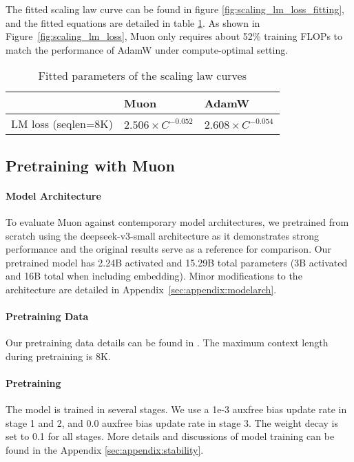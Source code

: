     
The fitted scaling law curve can be found in figure \ref{fig:scaling_lm_loss_fitting}, and the fitted equations are detailed in table \ref{tab:fit}. As shown in Figure~\ref{fig:scaling_lm_loss}, Muon only requires about 52\% training FLOPs to match the performance of AdamW under compute-optimal setting. 


\begin{table}
\centering
\caption{Fitted parameters of the scaling law curves}
\label{tab:fit}
\begin{tabular}{c|l|l}
\toprule
 & Muon & AdamW \\
\midrule
LM loss (seqlen=8K) & $2.506 \times C^{-0.052}$ & $2.608 \times C^{-0.054}$ \\
\bottomrule
\end{tabular}
\end{table}


\subsection{Pretraining with Muon}
\label{sec:exp:pretrain}

\paragraph{Model Architecture} To evaluate Muon against contemporary model architectures, we pretrained from scratch using the deepseek-v3-small architecture \citep{deepseekai2024deepseekv3technicalreport} as it demonstrates strong performance and the original results serve as a reference for comparison. Our pretrained model has 2.24B activated and 15.29B total parameters (3B activated and 16B total when including embedding). Minor modifications to the architecture are detailed in Appendix~\ref{sec:appendix:modelarch}.


\paragraph{Pretraining Data} Our pretraining data details can be found in \cite{k1p5}. The maximum context length during pretraining is 8K.


\paragraph{Pretraining} The model is trained in several stages. We use a 1e-3 auxfree bias update rate in stage 1 and 2, and 0.0 auxfree bias update rate in stage 3. The weight decay is set to 0.1 for all stages. More details and discussions of model training can be found in the Appendix \ref{sec:appendix:stability}.

